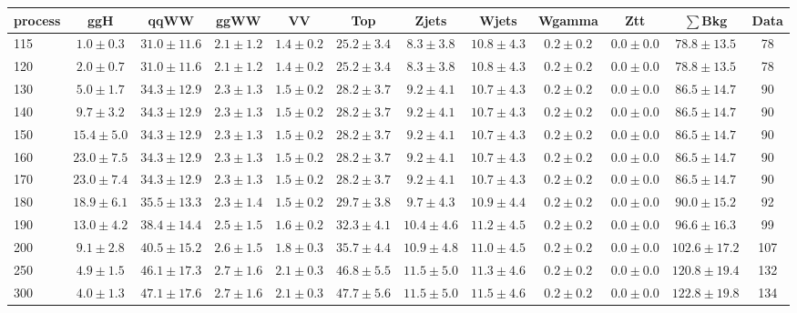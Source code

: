 \begin{table}
{\tiny
 \begin{center}
 \begin{tabular}{l c c c c c c c c c c c }
 \hline
 process & ggH & qqWW & ggWW & VV & Top & Zjets & Wjets & Wgamma & Ztt & $\sum$Bkg & Data \\
 \hline
115 & $1.0\pm0.3$ & $31.0\pm11.6$ & $2.1\pm1.2$ & $1.4\pm0.2$ & $25.2\pm3.4$ & $8.3\pm3.8$ & $10.8\pm4.3$ & $0.2\pm0.2$ & $0.0\pm0.0$ & $78.8\pm13.5$ & 78 \\
120 & $2.0\pm0.7$ & $31.0\pm11.6$ & $2.1\pm1.2$ & $1.4\pm0.2$ & $25.2\pm3.4$ & $8.3\pm3.8$ & $10.8\pm4.3$ & $0.2\pm0.2$ & $0.0\pm0.0$ & $78.8\pm13.5$ & 78 \\
130 & $5.0\pm1.7$ & $34.3\pm12.9$ & $2.3\pm1.3$ & $1.5\pm0.2$ & $28.2\pm3.7$ & $9.2\pm4.1$ & $10.7\pm4.3$ & $0.2\pm0.2$ & $0.0\pm0.0$ & $86.5\pm14.7$ & 90 \\
140 & $9.7\pm3.2$ & $34.3\pm12.9$ & $2.3\pm1.3$ & $1.5\pm0.2$ & $28.2\pm3.7$ & $9.2\pm4.1$ & $10.7\pm4.3$ & $0.2\pm0.2$ & $0.0\pm0.0$ & $86.5\pm14.7$ & 90 \\
150 & $15.4\pm5.0$ & $34.3\pm12.9$ & $2.3\pm1.3$ & $1.5\pm0.2$ & $28.2\pm3.7$ & $9.2\pm4.1$ & $10.7\pm4.3$ & $0.2\pm0.2$ & $0.0\pm0.0$ & $86.5\pm14.7$ & 90 \\
160 & $23.0\pm7.5$ & $34.3\pm12.9$ & $2.3\pm1.3$ & $1.5\pm0.2$ & $28.2\pm3.7$ & $9.2\pm4.1$ & $10.7\pm4.3$ & $0.2\pm0.2$ & $0.0\pm0.0$ & $86.5\pm14.7$ & 90 \\
170 & $23.0\pm7.4$ & $34.3\pm12.9$ & $2.3\pm1.3$ & $1.5\pm0.2$ & $28.2\pm3.7$ & $9.2\pm4.1$ & $10.7\pm4.3$ & $0.2\pm0.2$ & $0.0\pm0.0$ & $86.5\pm14.7$ & 90 \\
180 & $18.9\pm6.1$ & $35.5\pm13.3$ & $2.3\pm1.4$ & $1.5\pm0.2$ & $29.7\pm3.8$ & $9.7\pm4.3$ & $10.9\pm4.4$ & $0.2\pm0.2$ & $0.0\pm0.0$ & $90.0\pm15.2$ & 92 \\
190 & $13.0\pm4.2$ & $38.4\pm14.4$ & $2.5\pm1.5$ & $1.6\pm0.2$ & $32.3\pm4.1$ & $10.4\pm4.6$ & $11.2\pm4.5$ & $0.2\pm0.2$ & $0.0\pm0.0$ & $96.6\pm16.3$ & 99 \\
200 & $9.1\pm2.8$ & $40.5\pm15.2$ & $2.6\pm1.5$ & $1.8\pm0.3$ & $35.7\pm4.4$ & $10.9\pm4.8$ & $11.0\pm4.5$ & $0.2\pm0.2$ & $0.0\pm0.0$ & $102.6\pm17.2$ & 107 \\
250 & $4.9\pm1.5$ & $46.1\pm17.3$ & $2.7\pm1.6$ & $2.1\pm0.3$ & $46.8\pm5.5$ & $11.5\pm5.0$ & $11.3\pm4.6$ & $0.2\pm0.2$ & $0.0\pm0.0$ & $120.8\pm19.4$ & 132 \\
300 & $4.0\pm1.3$ & $47.1\pm17.6$ & $2.7\pm1.6$ & $2.1\pm0.3$ & $47.7\pm5.6$ & $11.5\pm5.0$ & $11.5\pm4.6$ & $0.2\pm0.2$ & $0.0\pm0.0$ & $122.8\pm19.8$ & 134 \\

\end{tabular}
\end{center}}
\end{table}
